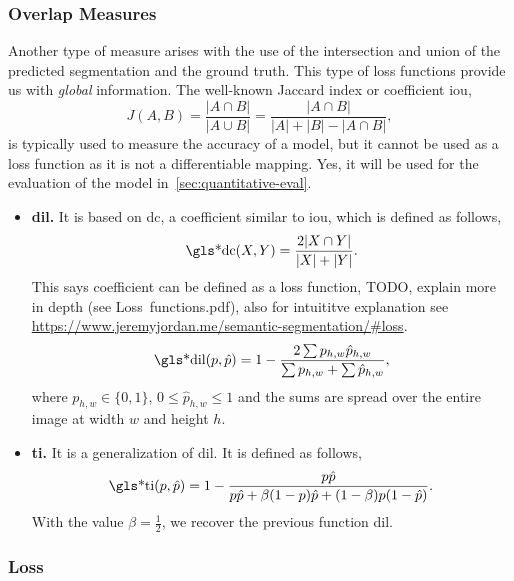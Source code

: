 \subsubsection{Overlap Measures}

Another type of measure arises with the use of the intersection and union of
the predicted segmentation and the ground truth. This type of loss functions
provide us with \emph{global} information. The well-known Jaccard
index or coefficient \gls{iou},
\begin{equation}
  J(A,B) = \frac{|A \cap B|}{|A \cup B|} =
  \frac{|A \cap B|}{|A| + |B| - |A \cap B|},
\end{equation}
is typically used to measure the accuracy of a model, but it cannot be used as
a loss function as it is not a differentiable mapping. Yes, it will be used for
the evaluation of the model in\ \vref{sec:quantitative-eval}.

\begin{itemize}
  \item \textbf{\gls{dil}.} It is based on \gls{dc}, a coefficient similar to
  \gls{iou}, which is defined as follows,
  \begin{equation}
    \text{\gls*{dc}}(X, Y) = \frac{2|X \cap Y|}{|X| + |Y|}.
  \end{equation}
  This says coefficient can be defined as a loss function, TODO, explain more
  in depth (see Loss\ functions.pdf), also for intuititve explanation see
  \url{https://www.jeremyjordan.me/semantic-segmentation/#loss}.
  \begin{equation}
    \text{\gls*{dil}}(p, \hat{p}) = 1 -
    \frac{2\sum p_{h, w}\hat{p}_{h, w}}{\sum p_{h, w} + \sum \hat{p}_{h, w}},
  \end{equation}
  where \(p_{h, w} \in \{0, 1\}\), \(0 \leq \hat{p}_{h, w} \leq 1\) and the
  sums are spread over the entire image at width \(w\) and height \(h\).
  \item \textbf{\gls{ti}.} It is a generalization of \gls{dil}. It is defined
  as follows,
  \begin{equation}
    \text{\gls*{ti}}(p, \hat{p}) = 1 -
    \frac{p\hat{p}}{p\hat{p} + \beta(1 - p)\hat{p} + (1 - \beta)p(1 - \hat{p})}.
  \end{equation}
  With the value \(\beta = \frac{1}{2}\), we recover the previous function
  \gls{dil}.
\end{itemize}

\subsubsection{ Loss}

